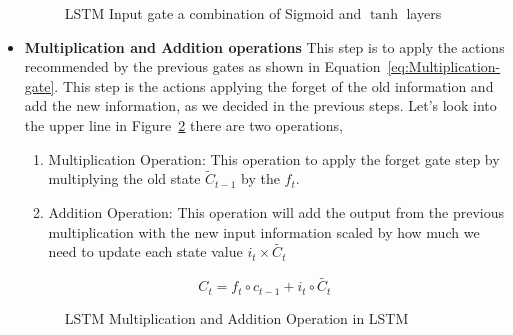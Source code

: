 \begin{itemize}
\begin{figure}[ht!]
    \centering
        
        \caption{LSTM Input gate a combination of Sigmoid and $\tanh$ layers~\cite{colah}}
        \label{fig:LSTM-input-gate}
\end{figure}


\item \textbf{Multiplication and Addition operations} This step is to apply the actions recommended by the previous gates as shown in Equation~\eqref{eq:Multiplication-gate}. This step is the actions applying the forget of the old information and add the new information, as we decided in the previous steps. Let's look into the upper line in Figure~\ref{fig:LSTM-pointwise-operations} there are two operations, 
  \begin{enumerate}
  \item Multiplication Operation: This operation to apply the forget gate step by multiplying the old state $\tilde{C}_{t-1} $ by the $f_t$.
  \item Addition Operation: This operation will add the output from the previous multiplication with the new input information scaled by how much we need to update each state value $i_t \times \tilde{C_t}$
    \end{enumerate}


\begin{equation}\label{eq:Multiplication-gate}
C_t  = f_t \circ c_{t-1} + i_t \circ \widetilde{C_t}
\end{equation}



    \begin{figure}[ht!]
      \centering
      
        \caption{LSTM Multiplication and Addition Operation in LSTM~\cite{colah}}
        \label{fig:LSTM-pointwise-operations}
      \end{figure}
      

\end{itemize}

